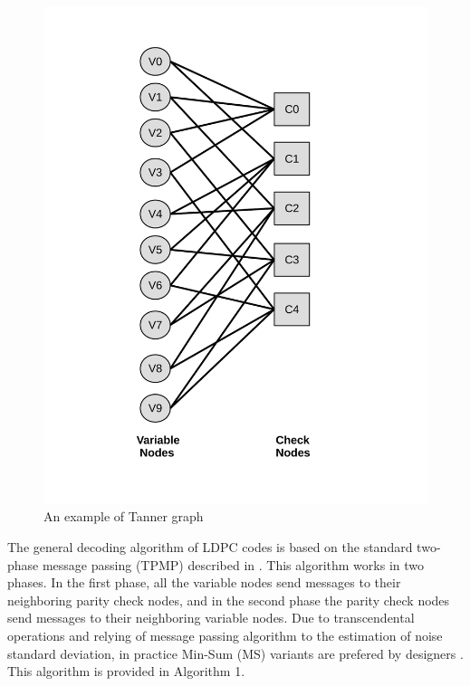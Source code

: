 \documentclass[conference]{IEEEtran}
\begin{document}
\begin{figure}[h]
\begin{centering}
\includegraphics[scale=0.35]{tanner.pdf}
\caption[width=.3\textwidth]{An example of Tanner graph}\label{fig::tanner}
\end{centering}
\end{figure}

The general decoding algorithm of LDPC codes is based on the standard two-phase message passing (TPMP) described in \cite{art_massively}. This algorithm works in two phases. In the first phase, all the variable nodes send messages to their neighboring parity check nodes, and in the second phase the parity check nodes send messages to their neighboring variable nodes. Due to transcendental operations and relying of message passing algorithm to the estimation of noise standard deviation, in practice Min-Sum (MS) variants are prefered by designers \cite{art_neon}. This algorithm is provided in Algorithm 1.
\end{document}
